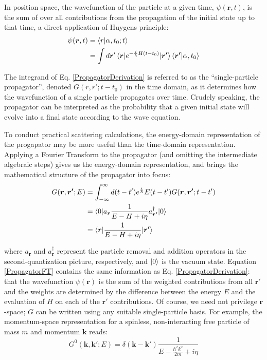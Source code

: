 \noindent
In position space, the wavefunction of the particle at a given time, $\psi(\bm{r},t)$,
is the sum of over all contributions from the propagation of the initial state up to that time,
a direct application of Huygens principle:
\begin{equation} \label{PropagatorDerivation}
    \begin{split}
        \psi(\bm{r},t) & = \braket{r|\alpha, t_{0}; t}\\
        & = \int d\bm{r}'
        \braket{\bm{r}|e^{-\frac{i}{\hbar}H(t-t_{0})}|\bm{r'}}\braket{\bm{r'}|\alpha,t_{0}}
    \end{split}
\end{equation}

\noindent
The integrand of Eq. \ref{PropagatorDerivation} is referred to as the
``single-particle propagator'', 
denoted $G(r, r'; t-t_{0})$ in the time domain,
as it determines how the wavefunction of a single particle
propagates over time. Crudely speaking, the propagator can be interpreted as the
probability that a given
initial state will evolve into a final state according to the wave equation.

To conduct practical scattering calculations, the energy-domain representation of the progapator
may be more useful than the time-domain representation. Applying a Fourier Transform to the propagator
(and omitting the intermediate algebraic steps) gives us the energy-domain representation,
and brings the mathematical structure of the propagator into focus:
\begin{equation} \label{PropagatorFT}
    \begin{split}
        G(\bm{r},\bm{r'};E) & = \int_{-\infty}^{\infty}d(t-t')e^\frac{i}{\hbar}E(t-t')G(\bm{r},\bm{r'}; t-t')\\
        & = \braket{0|a_{\bm{r}}\frac{1}{E-H+i\eta}a^{\dagger}_{\bm{r'}}|0}\\
        & = \braket{\bm{r} | \frac{1}{E-H+i\eta} | \bm{r'}}
    \end{split}
\end{equation}

\noindent
where $a_{\bm{r}}$ and $a^{\dagger}_{\bm{r}}$ represent the particle removal and
addition operators in
the second-quantization picture, respectively, and $\ket{0}$ is the vacuum state.
Equation \ref{PropagatorFT} contains the same information as Eq. \ref{PropagatorDerivation}: that
the wavefunction $\psi(\bm{r})$ is the sum of the weighted contributions from
all $\bm{r'}$ and the weights
are determined by the difference between the energy $E$ and the evaluation of
$H$ on each of the $\bm{r'}$
contributions. Of course, we need not privilege $\bm{r}$-space; $G$ can be written using any
suitable single-particle basis. For example, the momentum-space representation for a spinless,
non-interacting free particle of mass $m$ and momentum $\bm{k}$ reads:
\begin{equation} \label{PropagatorKSpace}
    G^{0}(\bm{k}, \bm{k'}; E) = \delta(\bm{k}-\bm{k'})\frac{1}{E-\frac{\hbar^{2}k^{2}}{2m} + i\eta}
\end{equation}


